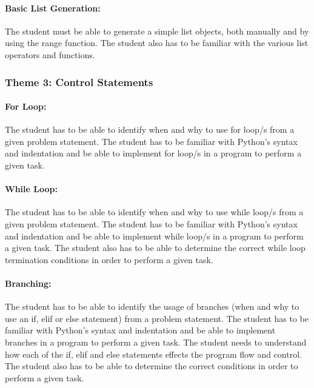             \paragraph{Basic List Generation:}
                The student must be able to generate a simple list objects,
                both manually and by using the range function. The student also
                has to be familiar with the various list operators and
                functions.

        \subsubsection{Theme 3: Control Statements}
            \paragraph{For Loop:}
                The student has to be able to identify when and why to use
                for loop/s from a given problem statement. The student has to
                be familiar with Python's syntax and indentation and be able
                to implement for loop/s in a program to perform a given task.

            \paragraph{While Loop:}
                The student has to be able to identify when and why to use
                while loop/s from a given problem statement. The student has to
                be familiar with Python's syntax and indentation and be able
                to implement while loop/s in a program to perform a given task.
                The student also has to be able to determine the correct
                while loop termination conditions in order to perform a given
                task.

            \paragraph{Branching:}
                The student has to be able to identify the usage of branches
                (when and why to use an if, elif or else statement) from
                a problem statement. The student has to be familiar with
                Python's syntax and indentation and be able to implement
                branches in a program to perform a given task. The student
                needs to understand how each of the if, elif and else
                statements effects the program flow and control. The student
                also has to be able to determine the correct conditions in
                order to perform a given task.

